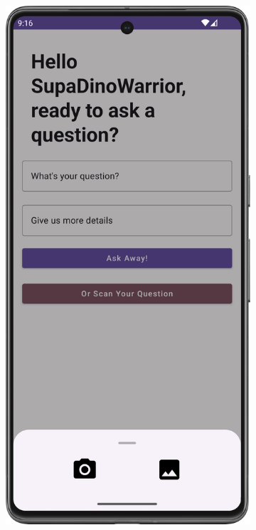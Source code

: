 \begin{figure}[H]
  \begin{subfigure}[b]{0.3\textwidth}
    \includegraphics[width=\textwidth]{Figures/Product_Images/OCR/select_input.png}

\end{subfigure}
\end{figure}
